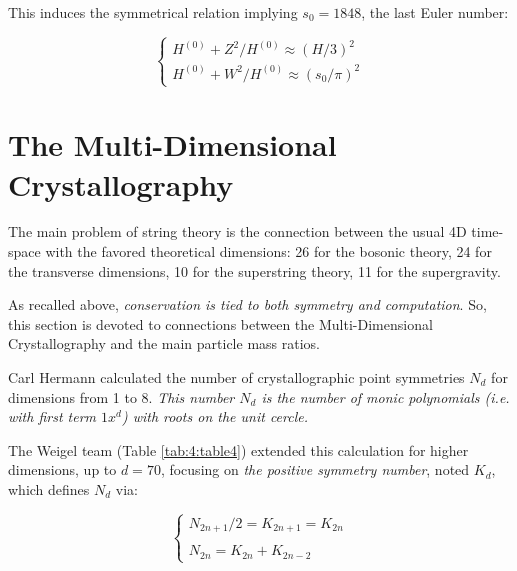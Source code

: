\documentclass[a4paper,9pt]{article}
\begin{document}
This induces the symmetrical relation implying $s_0 = 1848$, the last Euler number:

\begin{equation}\label{Eq21}
 \left\{
    \begin{array}{ll}
        H^{(0)} + Z^2/H^{(0)} \approx (H/3)^2\\
        H^{(0)} + W^2/H^{(0)} \approx (s_0/\pi)^2
    \end{array}
\right.
\end{equation}




\section{The Multi-Dimensional Crystallography}

The main problem of string theory is the connection between the usual 4D time-space with the favored theoretical dimensions: 26 for the bosonic theory, 24 for the transverse dimensions, 10 for the superstring theory, 11 for the supergravity. 

As recalled above, \textit{conservation is tied to both symmetry and computation}. So, this section is devoted to connections between the Multi-Dimensional Crystallography and the main particle mass ratios.

Carl Hermann \cite {Hermann} calculated the number of crystallographic point symmetries $N_d$ for dimensions from 1 to 8. \textit{This number $N_d$ is the number of monic polynomials (i.e. with first term $1x^d$) with roots on the unit cercle.}


The Weigel team\cite{Weigel} (Table \ref{tab:4:table4}) extended this calculation for higher dimensions, up to $d=70$, focusing on \textit{the positive symmetry number}, noted $K_{d}$, which defines $N_d$ via: 

\begin{equation}\label{Eq22}
 \left\{
    \begin{array}{ll}
            N_{2n+1}/2 =  K_{2n+1} =  K_{2n} \\
            \\
          N_{2n} = K_{2n} + K_{2n-2}
    \end{array}
\right.
\end{equation}
\end{document}
